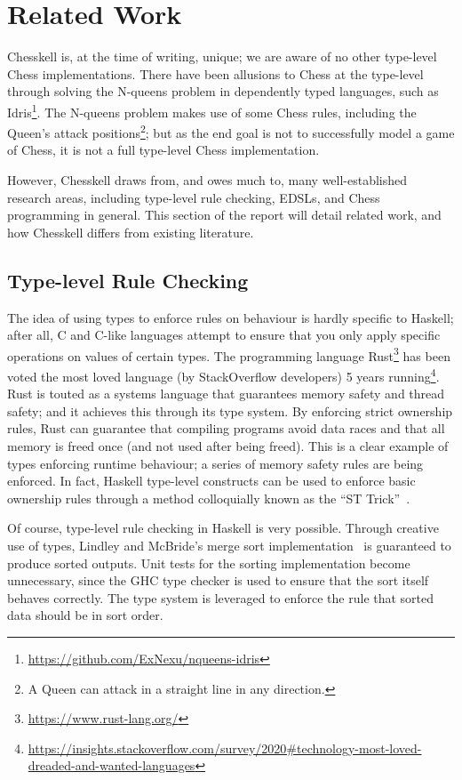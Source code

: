 \section{Related Work}

Chesskell is, at the time of writing, unique; we are aware of no other type-level Chess implementations. There have been allusions to Chess at the type-level through solving the N-queens problem in dependently typed languages, such as Idris\footnote{\url{https://github.com/ExNexu/nqueens-idris}}. The N-queens problem makes use of some Chess rules, including the Queen's attack positions\footnote{A Queen can attack in a straight line in any direction.}; but as the end goal is not to successfully model a game of Chess, it is not a full type-level Chess implementation.

However, Chesskell draws from, and owes much to, many well-established research areas, including type-level rule checking, EDSLs, and Chess programming in general. This section of the report will detail related work, and how Chesskell differs from existing literature.

\subsection{Type-level Rule Checking}

The idea of using types to enforce rules on behaviour is hardly specific to Haskell; after all, C and C-like languages attempt to ensure that you only apply specific operations on values of certain types. The programming language Rust\footnote{\url{https://www.rust-lang.org/}} has been voted the most loved language (by StackOverflow developers) 5 years running\footnote{\url{https://insights.stackoverflow.com/survey/2020\#technology-most-loved-dreaded-and-wanted-languages}}. Rust is touted as a systems language that guarantees memory safety and thread safety; and it achieves this through its type system. By enforcing strict ownership rules, Rust can guarantee that compiling programs avoid data races and that all memory is freed once (and not used after being freed). This is a clear example of types enforcing runtime behaviour; a series of memory safety rules are being enforced. In fact, Haskell type-level constructs can be used to enforce basic ownership rules through a method colloquially known as the ``ST Trick''~\cite{twt}.

Of course, type-level rule checking in Haskell is very possible. Through creative use of types, Lindley and McBride's merge sort implementation~\cite{hasochism} is guaranteed to produce sorted outputs. Unit tests for the sorting implementation become unnecessary, since the GHC type checker is used to ensure that the sort itself behaves correctly. The type system is leveraged to enforce the rule that sorted data should be in sort order.

